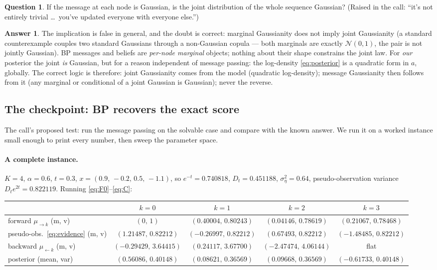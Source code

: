 \documentclass[11pt]{article}
\theoremstyle{definition}
\newtheorem{question}{Question}
\newtheorem*{answer}{Answer}
\theoremstyle{remark}
\newcommand{\N}{\mathcal{N}}
\begin{document}
\begin{question}
If the message at each node is Gaussian, is the joint distribution of the
whole sequence Gaussian? (Raised in the call: ``it's not entirely trivial
\dots\ you've updated everyone with everyone else.'')
\end{question}
\begin{answer}
The implication is false in general, and the doubt is correct: marginal
Gaussianity does not imply joint Gaussianity (a standard counterexample
couples two standard Gaussians through a non-Gaussian copula --- both
marginals are exactly $\N(0,1)$, the pair is not jointly Gaussian). BP
messages and beliefs are \emph{per-node marginal} objects; nothing about
their shape constrains the joint law. For \emph{our} posterior the joint
\emph{is} Gaussian, but for a reason independent of message passing: the
log-density \eqref{eq:posterior} is a quadratic form in $a$, globally. The
correct logic is therefore: joint Gaussianity comes from the model
(quadratic log-density); message Gaussianity then follows from it (any
marginal or conditional of a joint Gaussian is Gaussian); never the reverse.
\end{answer}

\subsection{The checkpoint: BP recovers the exact score}
\label{sec:checkpoint}

The call's proposed test: run the message passing on the solvable case and
compare with the known answer. We run it on a worked instance small enough
to print every number, then sweep the parameter space.

\paragraph{A complete instance.} $K=4$, $\alpha=0.6$, $t=0.3$,
$x=(0.9,\,-0.2,\,0.5,\,-1.1)$, so $e^{-t}=0.740818$, $D_t=0.451188$,
$\sigma_\eta^2=0.64$, pseudo-observation variance $D_te^{2t}=0.822119$.
Running \eqref{eq:F0}--\eqref{eq:C}:

\begin{center}\footnotesize
\setlength{\tabcolsep}{4pt}
\begin{tabular}{@{}lcccc@{}}
\toprule
 & $k=0$ & $k=1$ & $k=2$ & $k=3$\\
\midrule
forward $\mu_{\to k}$ (m, v) & $(0,\,1)$ & $(0.40004,\,0.80243)$
  & $(0.04146,\,0.78619)$ & $(0.21067,\,0.78468)$\\
pseudo-obs.\ \eqref{eq:evidence} (m, v) & $(1.21487,\,0.82212)$
  & $(-0.26997,\,0.82212)$ & $(0.67493,\,0.82212)$
  & $(-1.48485,\,0.82212)$\\
backward $\mu_{\leftarrow k}$ (m, v) & $(-0.29429,\,3.64415)$
  & $(0.24117,\,3.67700)$ & $(-2.47474,\,4.06144)$ & flat\\
\midrule
posterior (mean, var) & $(0.56086,\,0.40148)$ & $(0.08621,\,0.36569)$
  & $(0.09668,\,0.36569)$ & $(-0.61733,\,0.40148)$\\
\bottomrule
\end{tabular}
\end{center}
\end{document}
